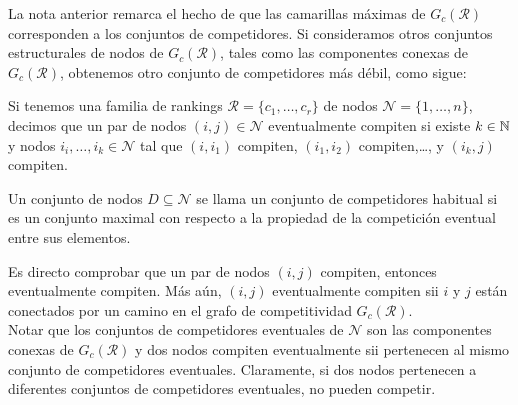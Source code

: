 La nota anterior remarca el hecho de que las camarillas máximas de $G_c(\mathcal{R})$ corresponden a los conjuntos de competidores. Si consideramos otros conjuntos estructurales de nodos de $G_c(\mathcal{R})$, tales como las componentes conexas de $G_c(\mathcal{R})$, obtenemos otro conjunto de competidores más débil, como sigue:

\begin{defi}
Si tenemos una familia de rankings $\mathcal{R} = \{c_1,\dots,c_r\}$ de nodos $\mathcal{N} = \{1,\dots,n\}$, decimos que un par de nodos $(i,j) \in \mathcal{N}$ eventualmente compiten si existe $k \in \mathbb{N}$ y nodos $i_i,\dots,i_k \in \mathcal{N}$ tal que $(i,i_1)$ compiten, $(i_1,i_2)$ compiten,\dots, y $(i_k,j)$ compiten. 
\end{defi}

\begin{defi}
Un conjunto de nodos $D \subseteq \mathcal{N}$ se llama un conjunto de competidores habitual si es un conjunto maximal con respecto a la propiedad de la competición eventual entre sus elementos.
\end{defi}


\begin{nota}
Es directo comprobar que un par de nodos $(i,j)$ compiten, entonces eventualmente compiten. Más aún, $(i,j)$ eventualmente compiten sii $i$ y $j$ están conectados por un camino en el grafo de competitividad $G_c(\mathcal{R})$.\\

Notar que los conjuntos de competidores eventuales de $\mathcal{N}$ son las componentes conexas de $G_c(\mathcal{R})$ y dos nodos compiten eventualmente sii pertenecen al mismo conjunto de competidores eventuales. Claramente, si dos nodos pertenecen a diferentes conjuntos de competidores eventuales, no pueden competir. 
\end{nota}



